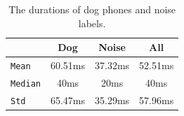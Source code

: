 

\begin{table}[th]
\centering
\small
\begin{tabular}{lccc}
\hline
\textbf{} & \textbf{Dog} & \textbf{Noise} & \textbf{All}\\
\hline
\verb|Mean| & 60.51ms & 37.32ms &  52.51ms\\
\verb|Median| & 40ms & 20ms & 40ms\\
\verb|Std| & 65.47ms & 35.29ms & 57.96ms\\\hline
\end{tabular}
\caption{The durations of dog phones and noise labels.}
\label{tab:phonedur}
\end{table}






